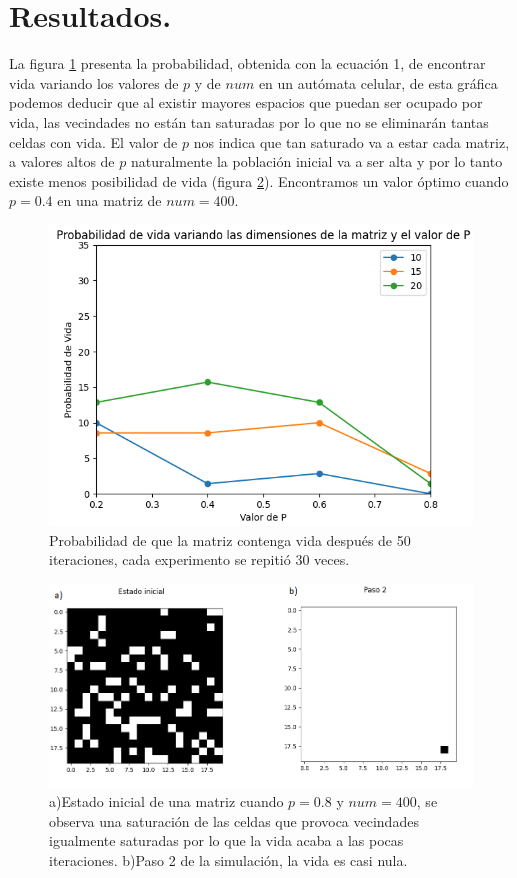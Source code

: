 \documentclass{article}
\begin{document}
\section{Resultados.}
La figura \ref{prob} presenta la probabilidad, obtenida con la ecuación 1, de encontrar vida variando los valores de $p$ y de $num$ en un autómata celular, de esta gráfica podemos deducir que al existir mayores espacios que puedan ser ocupado por vida, las vecindades no están tan saturadas por lo que no se eliminarán tantas celdas con vida. El valor de $p$ nos indica que tan saturado va a estar cada matriz, a valores altos de $p$ naturalmente la población inicial va a ser alta y por lo tanto existe menos posibilidad de vida (figura \ref{p0.8}). Encontramos un valor óptimo cuando $p=0.4$ en una matriz de $num=400$.
\begin{figure} 
    \centering
    \includegraphics[width=140mm]{prob.png} 
    \caption{Probabilidad de que la matriz contenga vida después de 50 iteraciones, cada experimento se repitió 30 veces.}
    \label{prob}
\end{figure}
\begin{figure} 
    \centering
    \includegraphics[width=140mm]{p0.4.png} 
    \caption{a)Estado inicial de una matriz cuando $p=0.8$ y $num=400$, se observa una saturación de las celdas que provoca vecindades igualmente saturadas por lo que la vida acaba a las pocas iteraciones. b)Paso 2 de la simulación, la vida es casi nula.}
    \label{p0.8}
\end{figure}
\end{document}
